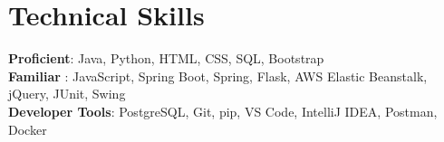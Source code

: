 \documentclass[letterpaper,11pt]{article}
\begin{document}
\section{Technical Skills}
 \begin{itemize}[leftmargin=0.15in, label={}]
    \small{\item{
     \textbf{Proficient}{: Java, Python, HTML, CSS, SQL, Bootstrap} \\
     \textbf{Familiar} {:  JavaScript, Spring Boot, Spring, Flask, AWS Elastic Beanstalk, jQuery, JUnit, Swing} \\
     \textbf{Developer Tools}{: PostgreSQL, Git, pip, VS Code, IntelliJ IDEA, Postman, Docker } \\
    }}
 \end{itemize}
 \vspace{-16pt}

\end{document}
